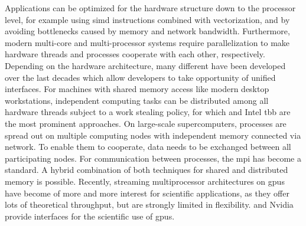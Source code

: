 
Applications can be optimized for the hardware structure down to the processor level, for example using \gls{simd} instructions combined with vectorization, and by avoiding bottlenecks caused by memory and network bandwidth.
Furthermore, modern multi-core and multi-processor systems require parallelization to make hardware threads and processes cooperate with each other, respectively. %
Depending on the hardware architecture, many different  have been developed over the last decades which allow developers to take opportunity of unified interfaces.
For machines with shared memory access like modern desktop workstations, independent computing tasks can be distributed among all hardware threads subject to a work stealing policy, for which \textsuperscript{\textregistered} \textcite{openmp50} and Intel\textsuperscript{\textregistered} \gls{tbb} \textcite{tbb2018} are the most prominent approaches.
On large-scale supercomputers, processes are spread out on multiple computing nodes with independent memory connected via network. To enable them to cooperate, data needs to be exchanged between all participating nodes. For communication between processes, the \gls{mpi} \textcite{mpi31} has become a standard. A hybrid combination of both techniques for shared and distributed memory is possible.
Recently, streaming multiprocessor architectures on \glspl{gpu} have become of more and more interest for scientific applications, as they offer lots of theoretical throughput, but are strongly limited in flexibility. \textsuperscript{\textregistered} \textcite{openacc27} and Nvidia\textsuperscript{\textregistered} \textsuperscript{\textregistered} \textcite{cuda10} provide interfaces for the scientific use of \glspl{gpu}.


